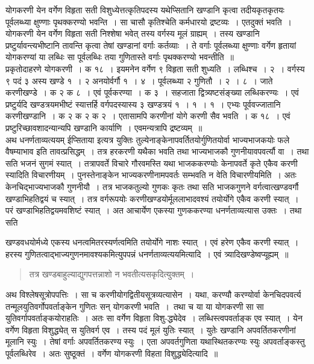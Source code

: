\documentclass[11pt, openany]{book}
\begin{document}
 योगकरणी येन वर्गेण विहृता सती विशुध्येत्तत्कृतिपदस्य यथेप्सितानि 
खण्डानि कृत्वा तदीयकृतकृतयः पूर्वलब्ध्या क्षुण्णाः पृथक्करण्यो भवन्ति~।
सा चासौ कृतिश्चेति कर्मधारयो द्रष्टव्यः~। एतदुक्तं भवति~। योगकरणी येन वर्गेण 
विहृता सती निश्शेषा भवेत् तस्य वर्गस्य मूलं ग्राह्यम्~। तस्य खण्डानि 
प्रष्टुर्यावन्त्यभीष्टानि तावन्ति कृत्वा तेषां खण्डानां वर्गाः
कर्तव्याः~। ते वर्गाः पूर्वलब्ध्या क्षुण्णाः वर्गेण हृतायां योगकरण्यां या लब्धिः सा 
पूर्वलब्धिः तया गुणितास्ते वर्गाः पृथक्करण्यो भवन्तीति~॥ \\

\vspace{-3mm}
 प्रकृतोदाहरणे योगकरणी~। क १८~। इयमनेन वर्गेण ९ विहृता सती 
शुध्यति~। लब्धिश्च~। २~। वर्गस्य ९ पदं ३ अस्य खण्डे १~। २ अनयोर्वर्गौ 
१~। ४~। पूर्वलब्ध्या २ गुणितौ~। २~। ८~। जाते करणीखण्डे~। क २ क ८~। 
एवं पूर्वकरण्या~। क ३~। सहजाता द्वित्र्यष्टसंङ्ख्या लब्धिकरण्यः~। एवं
प्रष्टुर्यदि खण्डत्रयमभीष्टं स्यात्तर्हि वर्गपदस्यास्य ३ खण्डत्रयं १~। १~। १~। एभ्यः
पूर्ववज्जातानि करणीखण्डानि~। क २ क २ क २~। एतासामपि करणीनां योगे करणी 
सैव भवति~। क १८~। एवं प्रष्टुरिच्छावशादन्यान्यपि खण्डानि कार्याणि~। 
एवमन्यत्रापि द्रष्टव्यम्~॥\\

\vspace{-3mm}
 अथ धनर्णताव्यत्ययम् ईप्सिताया इत्यत्र युक्तिः तुल्येनाङ्केनापवर्तितयोर्गुणितयोर्वा भाज्यभाजकयोः फले वैषम्याभाव इति तावत्प्रसिद्धम्~। तत्र 
हरकरणी यथैका भवति तथा भाज्यभाजकौ गुणनीयावपवर्त्यौ वा~। तथा सति 
भजनं सुगमं स्यात्~। तत्रापवर्ते विचारे गौरवमस्ति यथा भाजककरण्योः
केनापवर्ते कृते एकैव करणी स्यादिति विचारणीयम्~। पुनस्तेनाङ्केन भाज्यकरणीनामपवर्तः सम्भवति न वेति विचारणीयमिति~। अतः केनचिद्भाज्यभाजकौ गुणनीयौ~। तत्र भाजकतुल्यो गुणकः कृतः तथा सति भाजकगुणने वर्गत्वात्खण्डवर्गौ 
खण्डाभिहतिद्वयं च स्यात्~। तत्र वर्गरूपयोः करणीखण्डयोर्मूललाभादवश्यं 
तयोर्योगे एकैव करणी स्यात्~। परं खण्डाभिहतिद्वयमवशिष्टं स्यात्~। अत 
आचार्येण एकस्या गुणककरण्या धनर्णताव्यत्यास उक्तः~। तथा सति
\newpage

\noindent खण्डवधयोर्मध्ये एकस्य धनत्वमितरस्यर्णत्वमिति तयोर्योगे नाशः स्यात्~। एवं हरेण एकैव करणी स्यात्~। हरस्य गुणितत्वाद्भाज्यगुणनमावश्यकमित्युपपन्नं धनर्णताव्यत्ययमित्यादि~। एवं त्र्यादिखण्डेष्वप्यूह्यम्~॥ 
\begin{quote}
    \qt
     तत्र खण्डबाहुल्याद्युगपत्तन्नाशो न भवतीत्यसकृदित्युक्तम्~। 
\end{quote}

 अथ विश्लेषसूत्रोपपत्तिः~। सा च करणीयोगद्वितीयसूत्रव्यत्यासेन~। यथा, 
करण्यौ करण्योर्वा केनचिदपवर्त्य तन्मूलयुतिवर्गोपवर्ताङ्केन गुणितः सन् 
योगकरणी भवति~।~तथा च या या योगकरणी सा सा युतिवर्गापवर्ताङ्कयोराहतिः~। अतः सा वर्गेण विहृता विशु-द्ध्येदेव~। लब्धिस्त्वपवर्ताङ्क एव 
स्यात्~। येन वर्गेण विहृता विशुद्ध्येत् स युतिवर्ग एव~। तस्य पदं मूलं 
युतिः स्यात्~। युतेः खण्डानि अपवर्तितकरणीनां मूलानि स्युः~। तेषां 
वर्गाः अपवर्तितकरण्य स्युः~। एता अपवर्तगुणिता यथास्थितकरण्यः स्युः 
अपवर्ताङ्कस्तु पूर्वलब्धिरेव~। अतः सुष्ठूक्तं~। वर्गेण योगकरणी विहता
विशुद्ध्येदित्यादि~॥ \\
\end{document}
